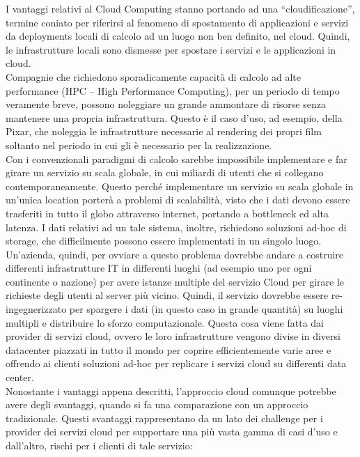 \documentclass{article}
\begin{document}
I vantaggi relativi al Cloud Computing stanno portando ad una “cloudificazione”, termine coniato per riferirsi al fenomeno di spostamento di applicazioni e servizi da deployments locali di calcolo ad un luogo non ben definito, nel cloud. Quindi, le infrastrutture locali sono dismesse per spostare i servizi e le applicazioni in cloud.\\
Compagnie che richiedono sporadicamente capacità di calcolo ad alte performance (HPC – High Performance Computing), per un periodo di tempo veramente breve, possono noleggiare un grande ammontare di risorse senza mantenere una propria infrastruttura. Questo è il caso d’uso, ad esempio, della Pixar, che noleggia le infrastrutture necessarie al rendering dei propri film soltanto nel periodo in cui gli è necessario per la realizzazione. \\
Con i convenzionali paradigmi di calcolo sarebbe impossibile implementare e far girare un servizio su scala globale, in cui miliardi di utenti che si collegano contemporaneamente. Questo perché implementare un servizio su scala globale in un’unica location porterà a problemi di scalabilità, visto che i dati devono essere trasferiti in tutto il globo attraverso internet, portando a bottleneck ed alta latenza. I dati relativi ad un tale sistema, inoltre, richiedono soluzioni ad-hoc di storage, che difficilmente possono essere implementati in un singolo luogo. Un’azienda, quindi, per ovviare a questo problema dovrebbe andare a costruire differenti infrastrutture IT in differenti luoghi (ad esempio uno per ogni continente o nazione) per avere istanze multiple del servizio Cloud per girare le richieste degli utenti al server più vicino. Quindi, il servizio dovrebbe essere re-ingegnerizzato per spargere i dati (in questo caso in grande quantità) su luoghi multipli e distribuire lo sforzo computazionale. Questa cosa viene fatta dai provider di servizi cloud, ovvero le loro infrastrutture vengono divise in diversi datacenter piazzati in tutto il mondo per coprire efficientemente varie aree e offrendo ai clienti soluzioni ad-hoc per replicare i servizi cloud su differenti data center.\\
Nonostante i vantaggi appena descritti, l’approccio cloud comunque potrebbe avere degli svantaggi, quando si fa una comparazione con un approccio tradizionale. Questi svantaggi rappresentano da un lato dei challenge per i provider dei servizi cloud per supportare una più vasta gamma di casi d’uso e dall’altro, rischi per i clienti di tale servizio:
\end{document}
